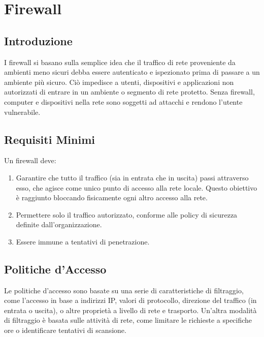 \chapter{Firewall}

\section{Introduzione}

I firewall si basano sulla semplice idea che il traffico di rete proveniente da ambienti meno sicuri debba essere autenticato e ispezionato prima di passare a un ambiente più sicuro. Ciò impedisce a utenti, dispositivi e applicazioni non autorizzati di entrare in un ambiente o segmento di rete protetto. Senza firewall, computer e dispositivi nella rete sono soggetti ad attacchi e rendono l'utente vulnerabile.

\section{Requisiti Minimi}

Un firewall deve:

\begin{enumerate}
    \item Garantire che tutto il traffico (sia in entrata che in uscita) passi attraverso esso, che agisce come unico punto di accesso alla rete locale. Questo obiettivo è raggiunto bloccando fisicamente ogni altro accesso alla rete.
    
    \item Permettere solo il traffico autorizzato, conforme alle policy di sicurezza definite dall'organizzazione.
    
    \item Essere immune a tentativi di penetrazione.
\end{enumerate}

\section{Politiche d'Accesso}

Le politiche d'accesso sono basate su una serie di caratteristiche di filtraggio, come l'accesso in base a indirizzi IP, valori di protocollo, direzione del traffico (in entrata o uscita), o altre proprietà a livello di rete e trasporto. Un'altra modalità di filtraggio è basata sulle attività di rete, come limitare le richieste a specifiche ore o identificare tentativi di scansione.

